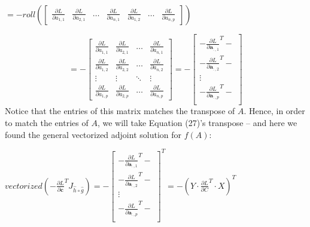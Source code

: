 \documentclass{article}
\begin{document}
\begin{center}
$=-roll(\begin{bmatrix}
        \frac{\partial L}{\partial a_{1,1}} & \frac{\partial L}{\partial a_{2,1}} & \hdots & \frac{\partial L}{\partial a_{n,1}} & \frac{\partial L}{\partial a_{1,2}} & \hdots& \frac{\partial L}{\partial a_{n,p}}
    \end{bmatrix})$
\end{center}
\begin{equation}
=-\begin{bmatrix}
        \frac{\partial L}{\partial a_{1,1}} & \frac{\partial L}{\partial a_{2,1}} & \hdots & \frac{\partial L}{\partial a_{n,1}} \\
        \frac{\partial L}{\partial a_{1,2}} & \frac{\partial L}{\partial a_{2,2}} & \hdots & \frac{\partial L}{\partial a_{n,2}} \\
        \vdots & \vdots & \ddots & \vdots\\
        \frac{\partial L}{\partial a_{1,p}} & \frac{\partial L}{\partial a_{2,p}} & \hdots & \frac{\partial L}{\partial a_{n,p}} 
    \end{bmatrix}=
    -\begin{bmatrix}
        -\frac{\partial L}{\partial \mathbf{a}_{:,1}}^T- \\
        -\frac{\partial L}{\partial \mathbf{a}_{:,2}}^T- \\
        \vdots\\
        -\frac{\partial L}{\partial \mathbf{a}_{:,p}}^T- \\
    \end{bmatrix}
\end{equation}
Notice that the entries of this matrix matches the transpose of $A$. Hence, in order to match the entries of $A$, we will take Equation (27)'s transpose -- and here we found the general vectorized adjoint solution for $f(A)$:
\begin{center}
    $vectorized(-\frac{\partial L}{\partial \mathbf{c}}^{T} J_{\widehat{h}\circ\widehat{g}}) = -\begin{bmatrix}
        -\frac{\partial L}{\partial \mathbf{a}_{:,1}}^T- \\
        -\frac{\partial L}{\partial \mathbf{a}_{:,2}}^T- \\
        \vdots\\
        -\frac{\partial L}{\partial \mathbf{a}_{:,p}}^T- \\
    \end{bmatrix}^T = -(Y \cdot \frac{\partial L}{\partial C}^T \cdot X)^T $
\end{center}
\end{document}
